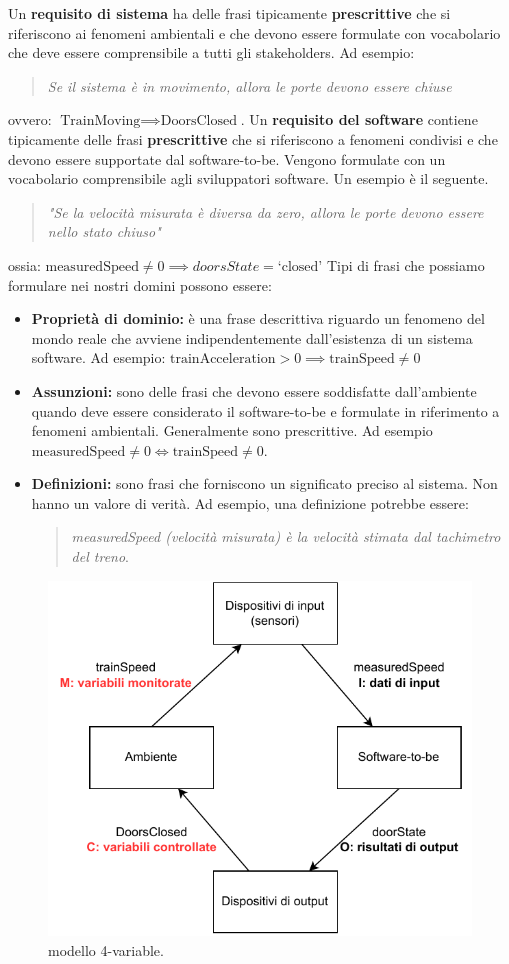 \documentclass[italian]{article}
\begin{document}
	Un \textbf{requisito di sistema} ha delle frasi tipicamente \textbf{prescrittive} che si riferiscono ai fenomeni ambientali e che devono essere formulate con vocabolario che deve essere comprensibile a tutti gli stakeholders. Ad esempio:
	\begin{quotation}
		\textit{Se il sistema è in movimento, allora le porte devono essere chiuse}
	\end{quotation}
	ovvero: $\text{TrainMoving} \implies \text{DoorsClosed}$.
	Un \textbf{requisito del software} contiene tipicamente delle frasi \textbf{prescrittive} che si riferiscono a fenomeni condivisi e che devono essere supportate dal software-to-be. Vengono formulate con un vocabolario comprensibile agli sviluppatori software. Un esempio è il seguente.
	\begin{quotation}
		\textit{"Se la velocità misurata è diversa da zero, allora le porte devono essere nello stato chiuso"}
	\end{quotation}
	ossia: $\text{measuredSpeed}\ne 0 \implies doorsState = \text{`closed'}$
	Tipi di frasi che possiamo formulare nei nostri domini possono essere:
	\begin{itemize}
		\item \textbf{Proprietà di dominio:} è una frase descrittiva riguardo un fenomeno del mondo reale che avviene indipendentemente dall'esistenza di un sistema software.
		Ad esempio: $\text{trainAcceleration} > 0 \implies \text{trainSpeed} \ne 0$
		\item \textbf{Assunzioni:} sono delle frasi che devono essere soddisfatte dall'ambiente quando deve essere considerato il software-to-be e formulate in riferimento a fenomeni ambientali. Generalmente sono prescrittive. Ad esempio
		$\text{measuredSpeed} \ne 0 \iff \text{trainSpeed} \ne 0$.
		\item \textbf{Definizioni:} sono frasi che forniscono un significato preciso al sistema. Non hanno un valore di verità. Ad esempio, una definizione potrebbe essere:
		\begin{quotation}
			\textit{measuredSpeed (velocità misurata) è la velocità stimata dal tachimetro del treno}.
		\end{quotation}
	\end{itemize}
	\begin{figure}[th]
		\centering
		\includegraphics[width=0.7\linewidth]{img/modello-4-variabili.drawio}
		\caption{modello 4-variable.}
		\label{fig:modello-4-variabili}
	\end{figure}
\end{document}
